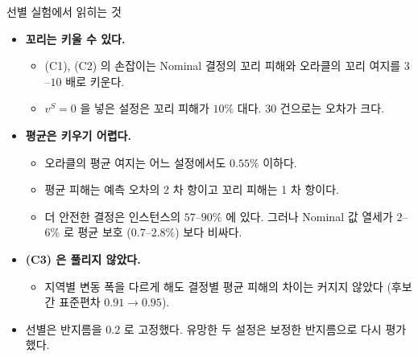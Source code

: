 \documentclass[aspectratio=169,11pt]{beamer}
\begin{document}
\begin{frame}{선별 실험에서 읽히는 것}
\begin{itemize}
  \item \textbf{꼬리는 키울 수 있다.}
  \begin{itemize}
    \item (C1), (C2) 의 손잡이는 Nominal 결정의 꼬리 피해와 오라클의 꼬리 여지를 $3$--$10$ 배로 키운다.
    \item $v^{S} = 0$ 을 넣은 설정은 꼬리 피해가 $10\%$ 대다. 30 건으로는 오차가 크다.
  \end{itemize}
  \item \textbf{평균은 키우기 어렵다.}
  \begin{itemize}
    \item 오라클의 평균 여지는 어느 설정에서도 $0.55\%$ 이하다.
    \item 평균 피해는 예측 오차의 2 차 항이고 꼬리 피해는 1 차 항이다.
    \item 더 안전한 결정은 인스턴스의 $57$--$90\%$ 에 있다. 그러나 Nominal 값 열세가 $2$--$6\%$ 로 평균 보호 ($0.7$--$2.8\%$) 보다 비싸다.
  \end{itemize}
  \item \textbf{(C3) 은 풀리지 않았다.}
  \begin{itemize}
    \item 지역별 변동 폭을 다르게 해도 결정별 평균 피해의 차이는 커지지 않았다 (후보 간 표준편차 $0.91 \to 0.95$).
  \end{itemize}
  \item 선별은 반지름을 $0.2$ 로 고정했다. 유망한 두 설정은 보정한 반지름으로 다시 평가했다.
\end{itemize}
\end{frame}
\end{document}
